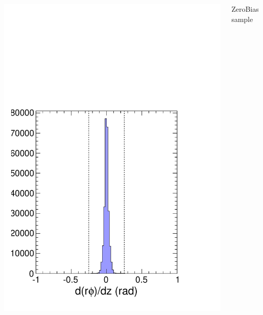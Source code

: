 \documentclass[compress]{beamer}
\begin{document}
\begin{frame}
\begin{columns}
\includegraphics[width=0.9\linewidth]{MCBeamHalo_beamline_pointing.pdf}

ZeroBias sample


\end{columns}
\end{frame}
\end{document}
